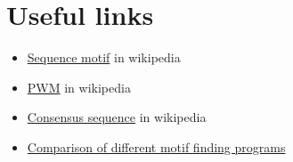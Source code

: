 \section{Useful links}
\label{sec:links}


\begin{itemize}
\item \href{https://en.wikipedia.org/wiki/Sequence_motif}{Sequence motif} in wikipedia
\item \href{https://en.wikipedia.org/wiki/Position_weight_matrix}{PWM} in wikipedia
\item \href{https://en.wikipedia.org/wiki/Consensus_sequence}{Consensus sequence} in wikipedia
\item \href{http://bio.cs.washington.edu/assessment/}{Comparison of different motif finding programs}
\end{itemize}
